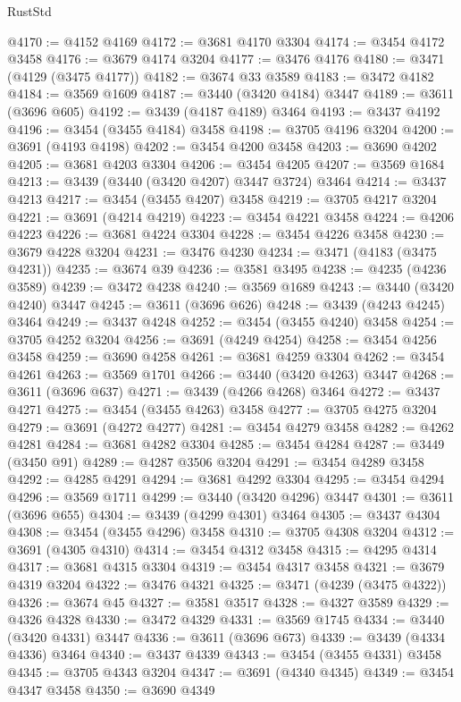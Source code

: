 \begin{lexlean}{RustStd}
\begin{coremodule}
{{{{{{{{{{{{{{{{{{{@4170 := @4152 @4169
@4172 := @3681 @4170 @3304
@4174 := @3454 @4172 @3458
@4176 := @3679 @4174 @3204
@4177 := @3476 @4176
@4180 := @3471 (@4129 (@3475 @4177))
@4182 := @3674 @33 @3589
@4183 := @3472 @4182
@4184 := @3569 @1609
@4187 := @3440 (@3420 @4184) @3447
@4189 := @3611 (@3696 @605)
@4192 := @3439 (@4187 @4189) @3464
@4193 := @3437 @4192
@4196 := @3454 (@3455 @4184) @3458
@4198 := @3705 @4196 @3204
@4200 := @3691 (@4193 @4198)
@4202 := @3454 @4200 @3458
@4203 := @3690 @4202
@4205 := @3681 @4203 @3304
@4206 := @3454 @4205
@4207 := @3569 @1684
@4213 := @3439 (@3440 (@3420 @4207) @3447 @3724) @3464
@4214 := @3437 @4213
@4217 := @3454 (@3455 @4207) @3458
@4219 := @3705 @4217 @3204
@4221 := @3691 (@4214 @4219)
@4223 := @3454 @4221 @3458
@4224 := @4206 @4223
@4226 := @3681 @4224 @3304
@4228 := @3454 @4226 @3458
@4230 := @3679 @4228 @3204
@4231 := @3476 @4230
@4234 := @3471 (@4183 (@3475 @4231))
@4235 := @3674 @39
@4236 := @3581 @3495
@4238 := @4235 (@4236 @3589)
@4239 := @3472 @4238
@4240 := @3569 @1689
@4243 := @3440 (@3420 @4240) @3447
@4245 := @3611 (@3696 @626)
@4248 := @3439 (@4243 @4245) @3464
@4249 := @3437 @4248
@4252 := @3454 (@3455 @4240) @3458
@4254 := @3705 @4252 @3204
@4256 := @3691 (@4249 @4254)
@4258 := @3454 @4256 @3458
@4259 := @3690 @4258
@4261 := @3681 @4259 @3304
@4262 := @3454 @4261
@4263 := @3569 @1701
@4266 := @3440 (@3420 @4263) @3447
@4268 := @3611 (@3696 @637)
@4271 := @3439 (@4266 @4268) @3464
@4272 := @3437 @4271
@4275 := @3454 (@3455 @4263) @3458
@4277 := @3705 @4275 @3204
@4279 := @3691 (@4272 @4277)
@4281 := @3454 @4279 @3458
@4282 := @4262 @4281
@4284 := @3681 @4282 @3304
@4285 := @3454 @4284
@4287 := @3449 (@3450 @91)
@4289 := @4287 @3506 @3204
@4291 := @3454 @4289 @3458
@4292 := @4285 @4291
@4294 := @3681 @4292 @3304
@4295 := @3454 @4294
@4296 := @3569 @1711
@4299 := @3440 (@3420 @4296) @3447
@4301 := @3611 (@3696 @655)
@4304 := @3439 (@4299 @4301) @3464
@4305 := @3437 @4304
@4308 := @3454 (@3455 @4296) @3458
@4310 := @3705 @4308 @3204
@4312 := @3691 (@4305 @4310)
@4314 := @3454 @4312 @3458
@4315 := @4295 @4314
@4317 := @3681 @4315 @3304
@4319 := @3454 @4317 @3458
@4321 := @3679 @4319 @3204
@4322 := @3476 @4321
@4325 := @3471 (@4239 (@3475 @4322))
@4326 := @3674 @45
@4327 := @3581 @3517
@4328 := @4327 @3589
@4329 := @4326 @4328
@4330 := @3472 @4329
@4331 := @3569 @1745
@4334 := @3440 (@3420 @4331) @3447
@4336 := @3611 (@3696 @673)
@4339 := @3439 (@4334 @4336) @3464
@4340 := @3437 @4339
@4343 := @3454 (@3455 @4331) @3458
@4345 := @3705 @4343 @3204
@4347 := @3691 (@4340 @4345)
@4349 := @3454 @4347 @3458
@4350 := @3690 @4349
}}}}}}}}}}}}}}}}}}}
\end{coremodule}
\end{lexlean}
